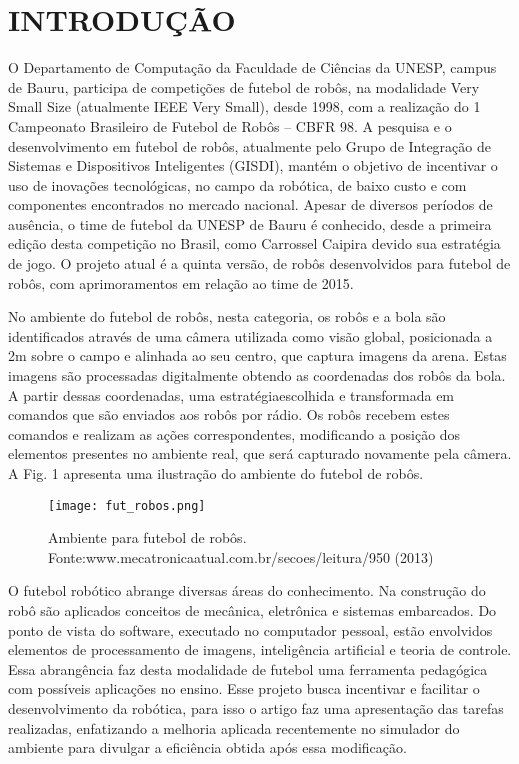  \section{INTRODU{\c C}{\~A}O}

O Departamento de Computa{\c c}{\~a}o da Faculdade de Ci{\^e}ncias
da UNESP, campus de Bauru, participa de competi{\c c}ões de
futebol de rob{\^o}s, na modalidade Very Small Size (atualmente
IEEE Very Small), desde 1998, com a realiza{\c c}{\~a}o do 1\textordmasculine
Campeonato Brasileiro de Futebol de Rob{\^o}s -- CBFR 98. A
pesquisa e o desenvolvimento em futebol de rob{\^o}s, atualmente
pelo Grupo de Integra{\c c}{\~a}o de Sistemas e Dispositivos
Inteligentes (GISDI), mant{\'e}m o objetivo de incentivar o uso de
inova{\c c}ões tecnol{\'o}gicas, no campo da rob{\'o}tica, de baixo custo e
com componentes encontrados no mercado nacional. Apesar
de diversos per{\'i}odos de aus{\^e}ncia, o time de futebol da UNESP
de Bauru {\'e} conhecido, desde a primeira edi{\c c}{\~a}o desta
competi{\c c}{\~a}o no Brasil, como Carrossel Caipira devido sua
estrat{\'e}gia de jogo. O projeto atual {\'e} a quinta vers{\~a}o, de rob{\^o}s
desenvolvidos para futebol de rob{\^o}s, com aprimoramentos em
rela{\c c}{\~a}o ao time de 2015.

No ambiente do futebol de rob{\^o}s, nesta categoria, os rob{\^o}s
e a bola s{\~a}o identificados atrav{\'e}s de uma c{\^a}mera utilizada
como vis{\~a}o global, posicionada a 2m sobre o campo e alinhada
ao seu centro, que captura imagens da arena. Estas imagens s{\~a}o
processadas digitalmente obtendo as coordenadas dos rob{\^o}s da bola.
A partir dessas coordenadas, uma estrat{\'e}giaescolhida e transformada em comandos que s{\~a}o enviados aos
rob{\^o}s por r{\'a}dio. Os rob{\^o}s recebem estes comandos e realizam
as a{\c c}ões correspondentes, modificando a posi{\c c}{\~a}o dos
elementos presentes no ambiente real, que ser{\'a} capturado
novamente pela c{\^a}mera. A Fig. 1 apresenta uma ilustra{\c c}{\~a}o do
ambiente do futebol de rob{\^o}s.

\begin{figure}[!htb]
\centering
\texttt{[image: fut\_robos.png]}
\caption{Ambiente para futebol de rob{\^o}s. Fonte:www.mecatronicaatual.com.br/secoes/leitura/950 (2013)}
\label{Rotulo}
\end{figure}

O futebol rob{\'o}tico abrange diversas {\'a}reas do conhecimento.
Na constru{\c c}{\~a}o do rob{\^o} s{\~a}o aplicados conceitos de mec{\^a}nica,
eletr{\^o}nica e sistemas embarcados. Do ponto de vista do
software, executado no computador pessoal, est{\~a}o envolvidos
elementos de processamento de imagens, intelig{\^e}ncia artificial
e teoria de controle. Essa abrang{\^e}ncia faz desta modalidade de
futebol uma ferramenta pedag{\'o}gica com poss{\'i}veis aplica{\c c}ões
no ensino.
Esse projeto busca incentivar e facilitar o desenvolvimento
da rob{\'o}tica, para isso o artigo faz uma apresenta{\c c}{\~a}o das tarefas
realizadas, enfatizando a melhoria aplicada recentemente no
simulador do ambiente para divulgar a efici{\^e}ncia obtida ap{\'o}s
essa modifica{\c c}{\~a}o.